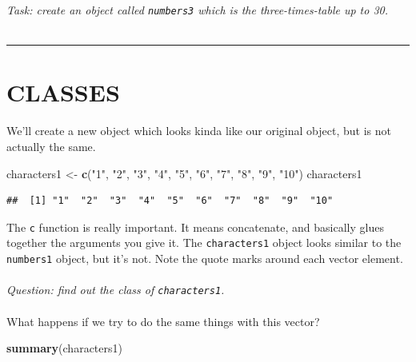 \documentclass[
]{book}
\newenvironment{Shaded}{\begin{snugshade}}{\end{snugshade}}
\newcommand{\KeywordTok}[1]{\textcolor[rgb]{0.13,0.29,0.53}{\textbf{#1}}}
\newcommand{\NormalTok}[1]{#1}
\newcommand{\StringTok}[1]{\textcolor[rgb]{0.31,0.60,0.02}{#1}}
\begin{document}
\emph{Task: create an object called \texttt{numbers3} which is the three-times-table up to
30.}\\
~\\

\begin{center}\rule{0.5\linewidth}{0.5pt}\end{center}

\hypertarget{classes}{%
\section{CLASSES}\label{classes}}

We'll create a new object which looks kinda like our original object, but is
not actually the same.

\begin{Shaded}
\begin{Highlighting}[]
\NormalTok{characters1 <-}\StringTok{ }\KeywordTok{c}\NormalTok{(}\StringTok{"1"}\NormalTok{, }\StringTok{"2"}\NormalTok{, }\StringTok{"3"}\NormalTok{, }\StringTok{"4"}\NormalTok{, }\StringTok{"5"}\NormalTok{, }\StringTok{"6"}\NormalTok{, }\StringTok{"7"}\NormalTok{, }\StringTok{"8"}\NormalTok{, }\StringTok{"9"}\NormalTok{, }\StringTok{"10"}\NormalTok{)}
\NormalTok{characters1}
\end{Highlighting}
\end{Shaded}

\begin{verbatim}
##  [1] "1"  "2"  "3"  "4"  "5"  "6"  "7"  "8"  "9"  "10"
\end{verbatim}

The \texttt{c} function is really important. It means concatenate, and basically
glues together the arguments you give it. The \texttt{characters1} object
looks similar to the \texttt{numbers1} object, but it's not. Note the quote marks
around each vector element.\\
~\\

\emph{Question: find out the class of \texttt{characters1}.}\\
~\\

What happens if we try to do the same things with this vector?

\begin{Shaded}
\begin{Highlighting}[]
\KeywordTok{summary}\NormalTok{(characters1)}
\end{Highlighting}
\end{Shaded}
\end{document}
